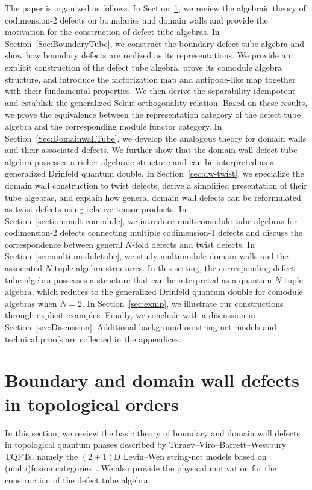 \documentclass[a4paper,11pt]{article}
\theoremstyle{definition}
\theoremstyle{remark}
\begin{document}
The paper is organized as follows. In Section~\ref{sec:AlgTheory}, we review the algebraic theory of codimension-2 defects on boundaries and domain walls and provide the motivation for the construction of defect tube algebras. In Section~\ref{Sec:BoundaryTube}, we construct the boundary defect tube algebra and show how boundary defects are realized as its representations. We provide an explicit construction of the defect tube algebra, prove its comodule algebra structure, and introduce the factorization map and antipode-like map together with their fundamental properties. We then derive the separability idempotent and establish the generalized Schur orthogonality relation. Based on these results, we prove the equivalence between the representation category of the defect tube algebra and the corresponding module functor category.
In Section~\ref{Sec:DomainwallTube}, we develop the analogous theory for domain walls and their associated defects. We further show that the domain wall defect tube algebra possesses a richer algebraic structure and can be interpreted as a generalized Drinfeld quantum double.
In Section~\ref{sec:dw-twist}, we specialize the domain wall construction to twist defects, derive a simplified presentation of their tube algebras, and explain how general domain wall defects can be reformulated as twist defects using relative tensor products.
In Section~\ref{section:multicomodule}, we introduce multicomodule tube algebras for codimension-2 defects connecting multiple codimension-1 defects and discuss the correspondence between general $N$-fold defects and twist defects.
In Section~\ref{sec:multi-moduletube}, we study multimodule domain walls and the associated $N$-tuple algebra structures. In this setting, the corresponding defect tube algebra possesses a structure that can be interpreted as a quantum $N$-tuple algebra, which reduces to the generalized Drinfeld quantum double for comodule algebras when $N=2$.
In Section~\ref{sec:exmp}, we illustrate our constructions through explicit examples. Finally, we conclude with a discussion in Section~\ref{sec:Discussion}. Additional background on string-net models and technical proofs are collected in the appendices.

\section{Boundary and domain wall defects in topological orders}
\label{sec:AlgTheory}
In this section, we review the basic theory of boundary and domain wall defects in topological quantum phases described by Turaev--Viro--Barrett--Westbury TQFTs, namely the $(2+1)$D Levin--Wen string-net models based on (multi)fusion categories~\cite{Levin2005,Kitaev2012boundary,kong2012universal,kirillov2011stringnet,Lin2021generalized,jia2024weakTube,turaev1992state,barrett1996invariants}. We also provide the physical motivation for the construction of the defect tube algebra.
\end{document}
